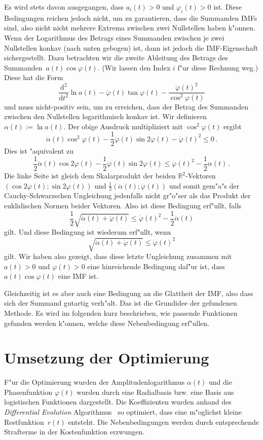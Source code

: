 \documentclass[a4paper]{scrartcl}
\newcommand{\R}{{\mathbb{R}}}
\newcommand{\de}{{\mathrm{d}}}
\newcommand{\pphi}{{\varphi}}
\begin{document}
Es wird stets davon ausgegangen, dass $a_i(t)>0$ und $\pphi_i(t)>0$ ist. 
Diese Bedingungen reichen jedoch nicht, um zu garantieren, dass die Summanden IMFs sind, also nicht nicht mehrere Extrema zwischen zwei Nullstellen haben k"onnen. 
Wenn der Logarithmus des Betrags eines Summanden zwischen je zwei Nullstellen konkav (nach unten gebogen) ist, dann ist jedoch die IMF-Eigenschaft sichergestellt. 
Dazu betrachten wir die zweite Ableitung des Betrags des Summanden~$a(t)\cos\pphi(t)$. 
(Wir lassen den Index $i$ f"ur diese Rechnung weg.)
Diese hat die Form
$$ \frac{\de^2}{\de t^2}\ln a(t)
-\ddot\pphi(t)\tan\pphi(t)
-\frac{\dot\pphi(t)^2}{\cos^2\pphi(t)} $$
und muss nicht-positiv sein, um zu erreichen, dass der Betrag des Summanden zwischen den Nullstellen logarithmisch konkav ist. 
Wir definieren $\alpha(t):=\ln a(t)$. 
Der obige Ausdruck multipliziert mit $\cos^2\pphi(t)$ ergibt
$$ \ddot\alpha(t)\cos^2\pphi(t)
-\frac12\ddot\pphi(t)\sin2\pphi(t)
-\dot\pphi(t)^2
\le 0\,. $$
Dies ist "aquivalent zu
$$ \frac12\ddot\alpha(t)\cos2\pphi(t)
-\frac12\ddot\pphi(t)\sin2\pphi(t)
\le \dot\pphi(t)^2-\frac12\ddot\alpha(t)\,. $$
Die linke Seite ist gleich dem Skalarprodukt der beiden $\R^2$-Vektoren $(\cos2\pphi(t);\sin2\pphi(t))$ und $\frac12(\ddot\alpha(t);\ddot\pphi(t))$ und somit gem"a"s der Cauchy-Schwarzschen Ungleichung jedenfalls nicht gr"o"ser als das Produkt der euklidischen Normen beider Vektoren. Also ist diese Bedingung erf"ullt, falls 
$$ \frac12\sqrt{\ddot\alpha(t)+\ddot\pphi(t)}
\le \dot\pphi(t)^2-\frac12\ddot\alpha(t) $$
gilt. Und diese Bedingung ist wiederum erf"ullt, wenn
$$ \sqrt{\ddot\alpha(t)+\ddot\pphi(t)}
\le \dot\pphi(t)^2 $$
gilt. Wir haben also gezeigt, dass diese letzte Ungleichung zusammen mit $a(t)>0$ und $\pphi(t)>0$ eine hinreichende Bedingung daf"ur ist, dass $a(t)\cos\pphi(t)$ eine IMF ist. 

Gleichzeitig ist es aber auch eine Bedingung an die Glattheit der IMF, also dass sich der Summand \glqq{}gutartig\grqq{} verh"alt.
Das ist die Grundidee der gefundenen Methode. 
Es wird im folgenden kurz beschrieben, wie passende Funktionen gefunden werden k"onnen, welche diese Nebenbedingung erf"ullen. 

\section{Umsetzung der Optimierung}

F"ur die Optimierung wurden der Amplitudenlogarithmus $\alpha(t)$ und die Phasenfunktion $\pphi(t)$ wurden durch eine Radialbasis bzw. eine Basis aus logistischen Funktionen dargestellt. 
Die Koeffizienten wurden anhand des {\em Differential Evolution} Algorithmus~\citep*{StPr1997} so optimiert, dass eine m"oglichst kleine Restfunktion~$r(t)$ entsteht. 
Die Nebenbedingungen werden durch entsprechende Strafterme in der Kostenfunktion erzwungen. 
\end{document}
